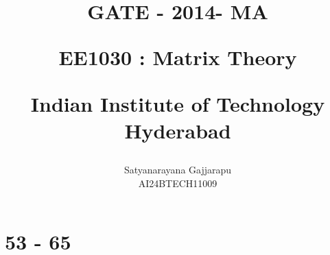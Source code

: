 \documentclass[journal]{IEEEtran}
\begin{document}

\vspace{3cm}




\title{
GATE - 2014- MA

\large{EE1030 : Matrix Theory}

Indian Institute of Technology Hyderabad
}
\author{Satyanarayana Gajjarapu

AI24BTECH11009
}	





\maketitle




\bigskip

\renewcommand{\thefigure}{\theenumi}
\renewcommand{\thetable}{\theenumi}


\section{53 - 65}
\end{document}
